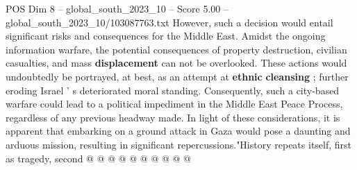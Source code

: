 \begin{textsample}{POS Dim 8 – global\_south\_2023\_10 – Score 5.00 – global\_south\_2023\_10/103087763.txt}
However, such a decision would entail significant risks and consequences for the Middle East.
Amidst the ongoing information warfare, the potential consequences of property destruction, civilian casualties, and mass \textbf{displacement} can not be overlooked.
These actions would undoubtedly be portrayed, at best, as an attempt at \textbf{ethnic} \textbf{cleansing} ; further eroding Israel ' s deteriorated moral standing.
Consequently, such a city-based warfare could lead to a political impediment in the Middle East Peace Process, regardless of any previous headway made.
In light of these considerations, it is apparent that embarking on a ground attack in Gaza would pose a daunting and arduous mission, resulting in significant repercussions."History repeats itself, first as tragedy, second @ @ @ @ @ @ @ @ @ @

\end{textsample}
